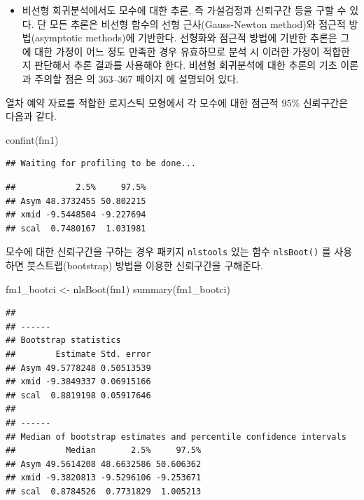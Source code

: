 \documentclass[
  10pt,
]{book}
\newenvironment{Shaded}{\begin{snugshade}}{\end{snugshade}}
\newcommand{\FunctionTok}[1]{\textcolor[rgb]{0.00,0.00,0.00}{#1}}
\newcommand{\NormalTok}[1]{#1}
\newcommand{\OtherTok}[1]{\textcolor[rgb]{0.56,0.35,0.01}{#1}}
\providecommand{\tightlist}{%
  \setlength{\itemsep}{0pt}\setlength{\parskip}{0pt}}
\theoremstyle{definition}
\theoremstyle{definition}
\theoremstyle{definition}
\theoremstyle{definition}
\theoremstyle{remark}
\begin{document}
\begin{itemize}
\tightlist
\item
  비선형 회귀분석에서도 모수에 대한 추론, 즉 가설검정과 신뢰구간 등을 구할 수 있다. 단 모든 추론은 비선형 함수의 선형 근사(Gauss-Newton method)와 점근적 방법(asymptotic methods)에 기반한다. 선형화와 점근적 방법에 기반한 추론은 그에 대한 가정이 어느 정도 만족한 경우 유효하므로 분석 시 이러한 가정이 적합한지 판단해서 추론 결과를 사용해야 한다. 비선형 회귀분석에 대한 추론의 기초 이론과 주의할 점은 \citet{kang2016you} 의 363--367 페이지 에 설명되어 있다.
\end{itemize}

열차 예약 자료를 적합한 로지스틱 모형에서 각 모수에 대한 점근적 95\% 신뢰구간은 다음과 같다.

\begin{Shaded}
\begin{Highlighting}[]
\FunctionTok{confint}\NormalTok{(fm1)}
\end{Highlighting}
\end{Shaded}

\begin{verbatim}
## Waiting for profiling to be done...
\end{verbatim}

\begin{verbatim}
##            2.5%     97.5%
## Asym 48.3732455 50.802215
## xmid -9.5448504 -9.227694
## scal  0.7480167  1.031981
\end{verbatim}

모수에 대한 신뢰구간을 구하는 경우 패키지 \texttt{nlstools} 있는 함수 \texttt{nlsBoot()} 를 사용하면 붓스트랩(bootstrap) 방법을 이용한 신뢰구간을 구해준다.

\begin{Shaded}
\begin{Highlighting}[]
\NormalTok{fm1\_bootci }\OtherTok{\textless{}{-}} \FunctionTok{nlsBoot}\NormalTok{(fm1)}
\FunctionTok{summary}\NormalTok{(fm1\_bootci)}
\end{Highlighting}
\end{Shaded}

\begin{verbatim}
## 
## ------
## Bootstrap statistics
##        Estimate Std. error
## Asym 49.5778248 0.50513539
## xmid -9.3849337 0.06915166
## scal  0.8819198 0.05917646
## 
## ------
## Median of bootstrap estimates and percentile confidence intervals
##          Median       2.5%     97.5%
## Asym 49.5614208 48.6632586 50.606362
## xmid -9.3820813 -9.5296106 -9.253671
## scal  0.8784526  0.7731829  1.005213
\end{verbatim}
\end{document}
